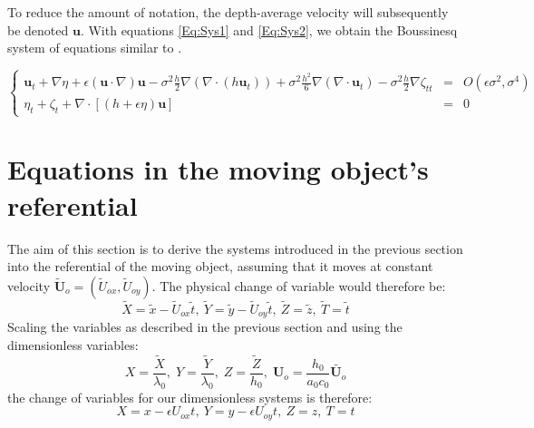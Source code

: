 \documentclass[11pt,a4paper]{article}
\begin{document}
			To reduce the amount of notation, the depth-average velocity will subsequently be denoted $\mathbf{u}$. With equations \eqref{Eq:Sys1} and \eqref{Eq:Sys2}, we obtain the Boussinesq system of equations similar to \cite{Peregrine}.
			\begin{center}
				$\left\lbrace
					\begin{array}{rll}
						\displaystyle \mathbf{u}_t + \nabla \eta + \epsilon (\mathbf{u} \cdot \nabla)\mathbf{u} - \sigma^2\frac{h}{2}\nabla (\nabla \cdot (h \mathbf{u}_t)) + \sigma^2 \frac{h^2}{6}\nabla (\nabla \cdot \mathbf{u}_t) - \sigma^2\frac{h}{2}\nabla \zeta_{tt}  & = & \displaystyle O(\epsilon \sigma^2, \sigma^4) \\
						\displaystyle \eta_t+\zeta_t + \nabla \cdot [(h+\epsilon\eta)\mathbf{u}] & = & 0
					\end{array}
				\right.$
			\end{center}
			
			\pagebreak
			
	\section{Equations in the moving object's referential}
	The aim of this section is to derive the systems introduced in the previous section into the referential of the moving object, assuming that it moves at constant velocity $\tilde{\mathbf{U}}_o = (\tilde{U}_{ox},\tilde{U}_{oy})$. The physical change of	variable would therefore be:
	\begin{equation*}
		\tilde{X} = \tilde{x} - \tilde{U}_{ox} \tilde t, \:
		\tilde{Y} = \tilde{y} - \tilde{U}_{oy} \tilde{t}, \:
		\tilde{Z} = \tilde{z}, \:
		\tilde{T} = \tilde{t}	
	\end{equation*}
	Scaling the variables as described in the previous section and using the dimensionless variables:
	\begin{equation*}
		X = \frac{\tilde{X}}{\lambda_0}, \;
		Y = \frac{\tilde{Y}}{\lambda_0}, \;
		Z = \frac{\tilde{Z}}{h_0}, \;
		\mathbf{U}_o = \frac{h_0}{a_0 c_0} \tilde{\mathbf{U}_o}
	\end{equation*}
	the change of variables for our dimensionless systems is therefore: 
	\begin{equation*}
		X = x - \epsilon U_{ox} t, \:
		Y = y - \epsilon U_{oy} t, \:
		Z = z, \:
		T = t	
	\end{equation*}
	
\end{document}
